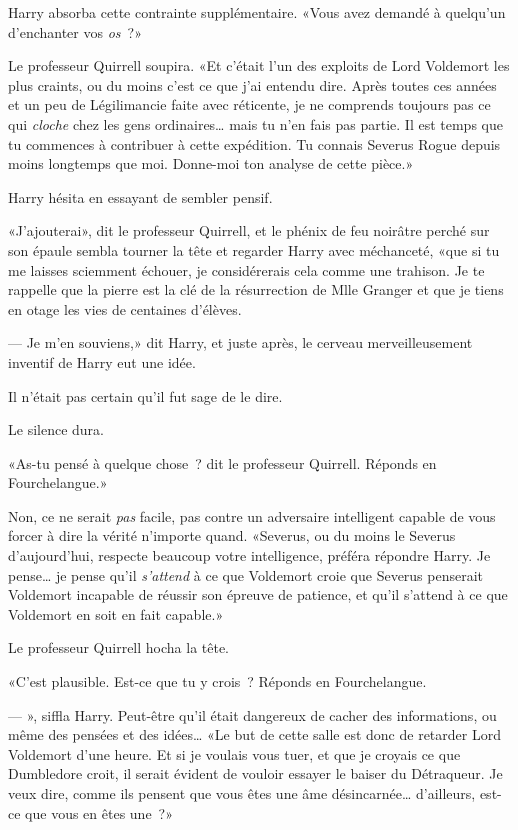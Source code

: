 Harry absorba cette contrainte supplémentaire. «Vous avez demandé à quelqu'un d'enchanter vos \emph{os}~?»

Le professeur Quirrell soupira. «Et c'était l'un des exploits de Lord Voldemort les plus craints, ou du moins c'est ce que j'ai entendu dire. Après toutes ces années et un peu de Légilimancie faite avec réticente, je ne comprends toujours pas ce qui \emph{cloche} chez les gens ordinaires… mais tu n'en fais pas partie. Il est temps que tu commences à contribuer à cette expédition. Tu connais Severus Rogue depuis moins longtemps que moi. Donne-moi ton analyse de cette pièce.»

Harry hésita en essayant de sembler pensif.

«J'ajouterai», dit le professeur Quirrell, et le phénix de feu noirâtre perché sur son épaule sembla tourner la tête et regarder Harry avec méchanceté, «que si tu me laisses sciemment échouer, je considérerais cela comme une trahison. Je te rappelle que la pierre est la clé de la résurrection de Mlle Granger et que je tiens en otage les vies de centaines d'élèves.

--- Je m'en souviens,» dit Harry, et juste après, le cerveau merveilleusement inventif de Harry eut une idée.

Il n'était pas certain qu'il fut sage de le dire.

Le silence dura.

«As-tu pensé à quelque chose~? dit le professeur Quirrell. Réponds en Fourchelangue.»

Non, ce ne serait \emph{pas} facile, pas contre un adversaire intelligent capable de vous forcer à dire la vérité n'importe quand. «Severus, ou du moins le Severus d'aujourd'hui, respecte beaucoup votre intelligence, préféra répondre Harry. Je pense… je pense qu'il \emph{s'attend} à ce que Voldemort croie que Severus penserait Voldemort incapable de réussir son épreuve de patience, et qu'il s'attend à ce que Voldemort en soit en fait capable.»

Le professeur Quirrell hocha la tête.

«C'est plausible. Est-ce que tu y crois~? Réponds en Fourchelangue.

--- », siffla Harry. Peut-être qu'il était dangereux de cacher des informations, ou même des pensées et des idées… «Le but de cette salle est donc de retarder Lord Voldemort d'une heure. Et si je voulais vous tuer, et que je croyais ce que Dumbledore croit, il serait évident de vouloir essayer le baiser du Détraqueur. Je veux dire, comme ils pensent que vous êtes une âme désincarnée… d'ailleurs, est-ce que vous en êtes une~?»

